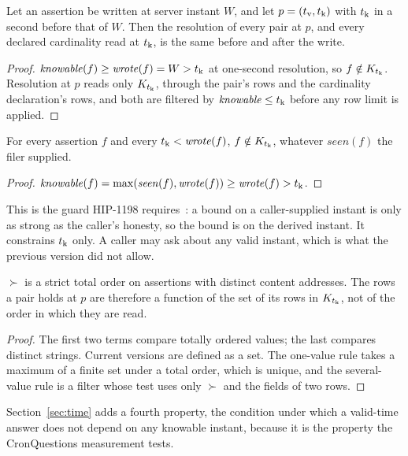 \begin{proposition}
\label{prop:stable}
Let an assertion be written at server instant $W$, and let $p = (t_{\mathrm{v}}, t_{\mathrm{k}})$ with
$t_{\mathrm{k}}$ in a second before that of $W$. Then the resolution of every pair at $p$,
and every declared cardinality read at $t_{\mathrm{k}}$, is the same before and after the
write.
\end{proposition}
\begin{proof}
$\mathit{knowable}(f) \ge \mathit{wrote}(f) = W > t_{\mathrm{k}}$ at one-second resolution, so
$f \notin K_{t_{\mathrm{k}}}$. Resolution at $p$ reads only $K_{t_{\mathrm{k}}}$, through the pair's
rows and the cardinality declaration's rows, and both are filtered by
$\mathit{knowable} \le t_{\mathrm{k}}$ before any row limit is applied.
\end{proof}

\begin{proposition}[No backdating]
\label{prop:noback}
For every assertion $f$ and every $t_{\mathrm{k}} < \mathit{wrote}(f)$, $f \notin K_{t_{\mathrm{k}}}$,
whatever $\mathit{seen}(f)$ the filer supplied.
\end{proposition}
\begin{proof}
$\mathit{knowable}(f) = \max(\mathit{seen}(f), \mathit{wrote}(f)) \ge
\mathit{wrote}(f) > t_{\mathrm{k}}$.
\end{proof}

This is the guard HIP-1198 requires~\cite{hip1198}: a bound on a
caller-supplied instant is only as strong as the caller's honesty, so the bound
is on the derived instant. It constrains $t_{\mathrm{k}}$ only. A caller may ask about any
valid instant, which is what the previous version did not allow.

\begin{proposition}
\label{prop:total}
$\succ$ is a strict total order on assertions with distinct content addresses.
The rows a pair holds at $p$ are therefore a function of the set of its rows in
$K_{t_{\mathrm{k}}}$, not of the order in which they are read.
\end{proposition}
\begin{proof}
The first two terms compare totally ordered values; the last compares distinct
strings. Current versions are defined as a set. The one-value rule takes a
maximum of a finite set under a total order, which is unique, and the
several-value rule is a filter whose test uses only $\succ$ and the fields of
two rows.
\end{proof}

Section~\ref{sec:time} adds a fourth property, the condition under which a
valid-time answer does not depend on any knowable instant, because it is the
property the CronQuestions measurement tests.

